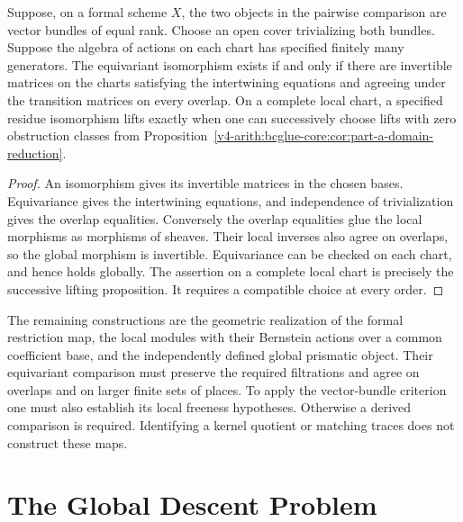\begin{proposition}
\label{v4-arith:bcglue-core:thm:core-final-reduction}
Suppose, on a formal scheme $X$, the two objects in the pairwise
comparison are vector bundles of equal rank.
Choose an open cover trivializing both bundles.
Suppose the algebra of actions on each chart has specified finitely
many generators. The equivariant isomorphism exists if and only if
there are invertible matrices on the charts satisfying the
intertwining equations and agreeing under the transition matrices
on every overlap.
On a complete local chart, a specified residue isomorphism lifts
exactly when one can successively choose lifts with zero obstruction
classes from
Proposition~\ref{v4-arith:bcglue-core:cor:part-a-domain-reduction}.
\end{proposition}

\begin{proof}
An isomorphism gives its invertible matrices in the chosen bases.
Equivariance gives the intertwining equations, and independence of
trivialization gives the overlap equalities.
Conversely the overlap equalities glue the local morphisms as
morphisms of sheaves. Their local inverses also agree on overlaps,
so the global morphism is invertible. Equivariance can be checked
on each chart, and hence holds globally.
The assertion on a complete local chart is precisely the successive
lifting proposition. It requires a compatible choice at every order.
\end{proof}

\begin{remark}
\label{v4-arith:bcglue-core:rem:what-remains}
\label{v4-arith:bcglue-core:rem:honesty}
The remaining constructions are the geometric realization of the
formal restriction map, the local modules with their Bernstein
actions over a common coefficient base, and the independently defined
global prismatic object. Their equivariant comparison must preserve
the required filtrations and agree on overlaps and on larger finite
sets of places. To apply the vector-bundle criterion one must also
establish its local freeness hypotheses. Otherwise a derived
comparison is required. Identifying a kernel quotient or matching
traces does not construct these maps.
\end{remark}

\section{The Global Descent Problem}
\label{v4-arith:bcglue-core:lacd-consequence}
\label{v4-arith:bcglue-core:summary}

